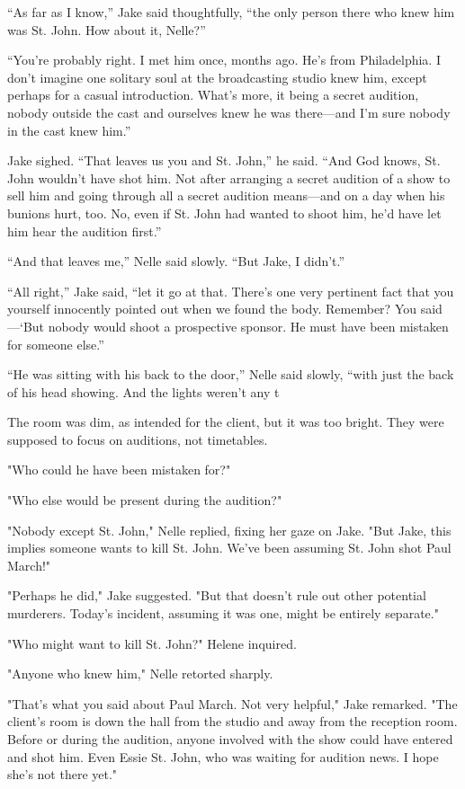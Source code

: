 \documentclass{novel}
\begin{document}
“As far as I know,” Jake said thoughtfully, “the only person there who knew him was St. John. How about it, Nelle?”

“You’re probably right. I met him once, months ago. He’s from Philadelphia. I don’t imagine one solitary soul at the broadcasting studio knew him, except perhaps for a casual introduction. What’s more, it being a secret audition, nobody outside the cast and ourselves knew he was there—and I’m sure nobody in the cast knew him.”

Jake sighed. “That leaves us you and St. John,” he said. “And God knows, St. John wouldn’t have shot him. Not after arranging a secret audition of a show to sell him and going through all a secret audition means—and on a day when his bunions hurt, too. No, even if St. John had wanted to shoot him, he’d have let him hear the audition first.”

“And that leaves me,” Nelle said slowly. “But Jake, I didn’t.”

“All right,” Jake said, “let it go at that. There’s one very pertinent fact that you yourself innocently pointed out when we found the body. Remember? You said—‘But nobody would shoot a prospective sponsor. He must have been mistaken for someone else.”

“He was sitting with his back to the door,” Nelle said slowly, “with just the back of his head showing. And the lights weren’t any t

The room was dim, as intended for the client, but it was too bright. They were supposed to focus on auditions, not timetables.

"Who could he have been mistaken for?"

"Who else would be present during the audition?"

"Nobody except St. John," Nelle replied, fixing her gaze on Jake. "But Jake, this implies someone wants to kill St. John. We've been assuming St. John shot Paul March!"

"Perhaps he did," Jake suggested. "But that doesn't rule out other potential murderers. Today's incident, assuming it was one, might be entirely separate."

"Who might want to kill St. John?" Helene inquired.

"Anyone who knew him," Nelle retorted sharply.

"That's what you said about Paul March. Not very helpful," Jake remarked. "The client's room is down the hall from the studio and away from the reception room. Before or during the audition, anyone involved with the show could have entered and shot him. Even Essie St. John, who was waiting for audition news. I hope she's not there yet."
\end{document}
